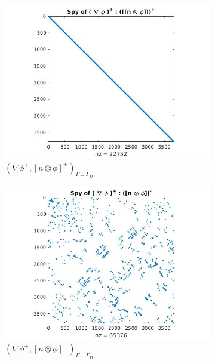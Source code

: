 \documentclass[a4paper,12pt]{book}
\begin{document}
\begin{figure}[H]
\begin{subfigure}{.5\textwidth}
\centering
  \includegraphics[width=\linewidth]{figure31.jpg}
  \caption{$( \nabla \phi^+ ,[n \otimes \phi]^+)_{\Gamma \cup \Gamma_D}$}
  \label{fig:figure31}
\end{subfigure}
\begin{subfigure}{.5\textwidth}	
\centering
  \includegraphics[width=\linewidth]{figure32.jpg}
  \caption{$( \nabla \phi^+ ,[n \otimes \phi]^-)_{\Gamma \cup \Gamma_D}$}
  \label{fig:figure32}
\end{subfigure}
\begin{subfigure}{.5\textwidth}
\centering

\end{subfigure}
\end{figure}
\end{document}
